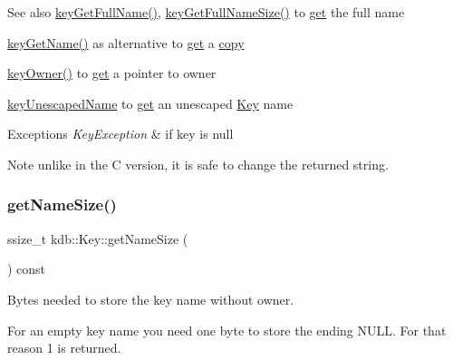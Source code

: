 \begin{DoxyItemize}
\begin{DoxySeeAlso}{See also}
\hyperlink{group__keyname_gaaba1494a5ffc976e0e56c43f4334a23c}{key\+Get\+Full\+Name()}, \hyperlink{group__keyname_gab65dc9d43d3ee08d5e936a20ebbddd23}{key\+Get\+Full\+Name\+Size()} to \hyperlink{classkdb_1_1Key_ac558a1f1b2cb50d77fbabcbb24950c05}{get} the full name 

\hyperlink{group__keyname_gab29a850168d9b31c9529e90cf9ab68be}{key\+Get\+Name()} as alternative to \hyperlink{classkdb_1_1Key_ac558a1f1b2cb50d77fbabcbb24950c05}{get} a \hyperlink{classkdb_1_1Key_ab5bc93e22f4cf40b9d2b1fc32cc260be}{copy} 

\hyperlink{owner_8c_af6485fb8599714b6bbd830cf915ffea5}{key\+Owner()} to \hyperlink{classkdb_1_1Key_ac558a1f1b2cb50d77fbabcbb24950c05}{get} a pointer to owner 

\hyperlink{group__keyname_ga6fe6af4c27b35d911a533f4ae4d698bb}{key\+Unescaped\+Name} to \hyperlink{classkdb_1_1Key_ac558a1f1b2cb50d77fbabcbb24950c05}{get} an unescaped \hyperlink{group__key}{Key} name
\end{DoxySeeAlso}

\begin{DoxyExceptions}{Exceptions}
{\em Key\+Exception} & if key is null\\
\hline
\end{DoxyExceptions}
\begin{DoxyNote}{Note}
unlike in the C version, it is safe to change the returned string. 
\end{DoxyNote}

\end{DoxyItemize}\mbox{\label{classkdb_1_1Key_a976627183cdc6835a969475e99ec8bc1}} 
\subsubsection{\texorpdfstring{get\+Name\+Size()}{getNameSize()}}
{\footnotesize\ttfamily ssize\+\_\+t kdb\+::\+Key\+::get\+Name\+Size (\begin{DoxyParamCaption}{ }\end{DoxyParamCaption}) const\hspace{0.3cm}{\ttfamily [inline]}}



Bytes needed to store the key name without owner. 

For an empty key name you need one byte to store the ending N\+U\+LL. For that reason 1 is returned.


